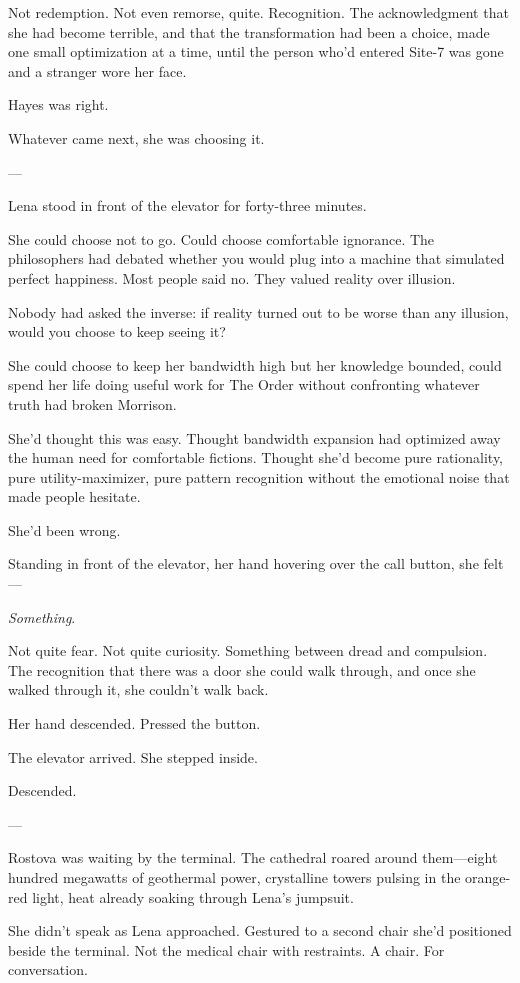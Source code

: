 Not redemption. Not even remorse, quite. Recognition. The acknowledgment that she had become terrible, and that the transformation had been a choice, made one small optimization at a time, until the person who'd entered Site-7 was gone and a stranger wore her face.

Hayes was right.

Whatever came next, she was choosing it.

---

Lena stood in front of the elevator for forty-three minutes.

She could choose not to go. Could choose comfortable ignorance. The philosophers had debated whether you would plug into a machine that simulated perfect happiness. Most people said no. They valued reality over illusion.

Nobody had asked the inverse: if reality turned out to be worse than any illusion, would you choose to keep seeing it?

She could choose to keep her bandwidth high but her knowledge bounded, could spend her life doing useful work for The Order without confronting whatever truth had broken Morrison.

She'd thought this was easy. Thought bandwidth expansion had optimized away the human need for comfortable fictions. Thought she'd become pure rationality, pure utility-maximizer, pure pattern recognition without the emotional noise that made people hesitate.

She'd been wrong.

Standing in front of the elevator, her hand hovering over the call button, she felt—

\textit{Something}.

Not quite fear. Not quite curiosity. Something between dread and compulsion. The recognition that there was a door she could walk through, and once she walked through it, she couldn't walk back.

Her hand descended. Pressed the button.

The elevator arrived. She stepped inside.

Descended.

---

Rostova was waiting by the terminal. The cathedral roared around them—eight hundred megawatts of geothermal power, crystalline towers pulsing in the orange-red light, heat already soaking through Lena's jumpsuit.

She didn't speak as Lena approached. Gestured to a second chair she'd positioned beside the terminal. Not the medical chair with restraints. A chair. For conversation.

